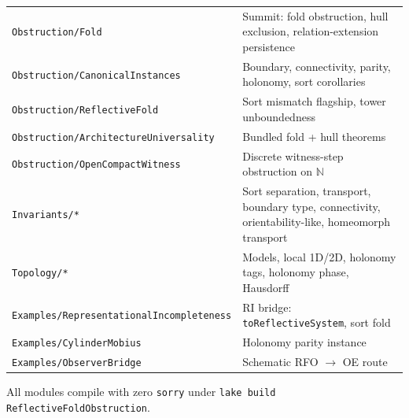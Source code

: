 \documentclass[11pt]{article}
\theoremstyle{plain}
\theoremstyle{definition}
\theoremstyle{remark}
\begin{document}
\begin{center}
\begin{tabular}{@{}p{}p{}@{}}
\texttt{Obstruction/Fold} & Summit: fold obstruction, hull exclusion, relation-extension persistence \\
\texttt{Obstruction/CanonicalInstances} & Boundary, connectivity, parity, holonomy, sort corollaries \\
\texttt{Obstruction/ReflectiveFold} & Sort mismatch flagship, tower unboundedness \\
\texttt{Obstruction/Architecture\-Universality} & Bundled fold + hull theorems \\
\texttt{Obstruction/OpenCompactWitness} & Discrete witness-step obstruction on $\mathbb{N}$ \\
\midrule
\texttt{Invariants/*} & Sort separation, transport, boundary type, connectivity, orientability-like, homeomorph transport \\
\texttt{Topology/*} & Models, local 1D/2D, holonomy tags, holonomy phase, Hausdorff \\
\midrule
\texttt{Examples/Representational\-Incompleteness} & RI bridge: \texttt{toReflectiveSystem}, sort fold \\
\texttt{Examples/CylinderMobius} & Holonomy parity instance \\
\texttt{Examples/ObserverBridge} & Schematic RFO $\to$ OE route \\
\bottomrule
\end{tabular}
\end{center}
\normalsize

\noindent
All modules compile with zero \texttt{sorry} under
\texttt{lake build ReflectiveFoldObstruction}.
\end{document}
